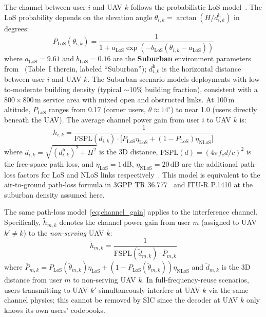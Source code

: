 \documentclass[journal]{IEEEtran}
\begin{document}
The channel between user $i$ and UAV $k$ follows the probabilistic LoS model~\cite{alhourani2014optimal}.
The LoS probability depends on the elevation angle $\theta_{i,k} = \arctan(H / d_{i,k}^{\text{h}})$ in degrees:
\begin{equation}
    P_{\text{LoS}}(\theta_{i,k}) = \frac{1}{1 + a_{\text{LoS}} \exp\!\left(-b_{\text{LoS}}(\theta_{i,k} - a_{\text{LoS}})\right)}
\end{equation}
where $a_{\text{LoS}} = 9.61$ and $b_{\text{LoS}} = 0.16$ are the \textbf{Suburban} environment parameters from~\cite{alhourani2014optimal} (Table~I therein, labeled ``Suburban''); $d_{i,k}^{\text{h}}$ is the horizontal distance between user $i$ and UAV $k$.
The Suburban scenario models deployments with low-to-moderate building density (typical $\sim$10\% building fraction), consistent with a 800\,$\times$\,800\,m service area with mixed open and obstructed links.
At 100\,m altitude, $P_{\text{LoS}}$ ranges from 0.17 (corner users, $\theta \approx 14^\circ$) to near 1.0 (users directly beneath the UAV).
The average channel power gain from user $i$ to UAV $k$ is:
\begin{equation}
    h_{i,k} = \frac{1}{\mathrm{FSPL}(d_{i,k}) \cdot \bigl[P_{\text{LoS}} \eta_{\text{LoS}} + (1-P_{\text{LoS}}) \eta_{\text{NLoS}}\bigr]}
    \label{eq:channel_gain}
\end{equation}
where $d_{i,k} = \sqrt{(d_{i,k}^{\text{h}})^2 + H^2}$ is the 3D distance, $\mathrm{FSPL}(d) = (4\pi f_c d/c)^2$ is the free-space path loss, and $\eta_{\text{LoS}} = 1$\,dB, $\eta_{\text{NLoS}} = 20$\,dB are the additional path-loss factors for LoS and NLoS links respectively~\cite{alhourani2014optimal}.
This model is equivalent to the air-to-ground path-loss formula in 3GPP TR 36.777~\cite{3gpp36777} and ITU-R P.1410 at the suburban density assumed here.

The same path-loss model~\eqref{eq:channel_gain} applies to the interference channel.
Specifically, $\tilde{h}_{m,k}$ denotes the channel power gain from user $m$ (assigned to UAV $k' \neq k$) to the \emph{non-serving} UAV $k$:
\begin{equation}
    \tilde{h}_{m,k} = \frac{1}{\mathrm{FSPL}(\tilde{d}_{m,k}) \cdot \bar{P}_{m,k}}
    \label{eq:interf_channel}
\end{equation}
where $\bar{P}_{m,k} = P_{\text{LoS}}(\tilde{\theta}_{m,k}) \eta_{\text{LoS}} + (1\!-\!P_{\text{LoS}}(\tilde{\theta}_{m,k})) \eta_{\text{NLoS}}$ and $\tilde{d}_{m,k}$ is the 3D distance from user $m$ to non-serving UAV $k$.
In full-frequency-reuse scenarios, users transmitting to UAV $k'$ simultaneously interfere at UAV $k$ via the same channel physics; this cannot be removed by SIC since the decoder at UAV $k$ only knows its own users' codebooks.
\end{document}
